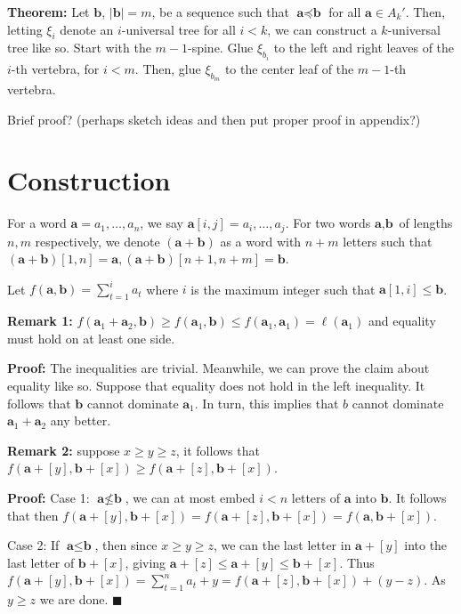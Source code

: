 \documentclass{article}
\begin{document}
\textbf{Theorem:} Let $\textbf{b}$, $|\textbf{b}|=m$, be a sequence such that $\textbf{a}\preceq \textbf{b}$ for all $\textbf{a} \in A_k'$. Then, letting $\xi_i$ denote an $i$-universal tree for all $i<k$, we can construct a $k$-universal tree like so. Start with the $m-1$-spine. Glue $\xi_{b_i}$ to the left and right leaves of the $i$-th vertebra, for $i < m$. Then, glue $\xi_{b_m}$ to the center leaf of the $m-1$-th vertebra.


Brief proof? (perhaps sketch ideas and then put proper proof in appendix?)


\section{Construction}

For a word $\textbf{a} = a_1,\dots ,a_n$, we say $\textbf{a}[i,j] = a_i,\dots, a_j$. For two words $\textbf{a},\textbf{b}$ of lengths $n,m$ respectively, we denote $(\textbf{a}+\textbf{b})$ as a word with $n+m$ letters such that $(\textbf{a}+\textbf{b})[1,n] = \textbf{a}, (\textbf{a}+\textbf{b})[n+1,n+m] = \textbf{b}$.

Let $f(\textbf{a},\textbf{b}) = \sum_{t=1}^i a_t$ where $i$ is the maximum integer such that $\textbf{a}[1,i] \le \textbf{b}$.

\textbf{Remark 1:} $f(\textbf{a}_1+\textbf{a}_2,\textbf{b}) \ge f(\textbf{a}_1,\textbf{b})\le f(\textbf{a}_1,\textbf{a}_1) = \ell(\textbf{a}_1)$ and equality must hold on at least one side.

\textbf{Proof:} The inequalities are trivial. Meanwhile, we can prove the claim about equality like so. Suppose that equality does not hold in the left inequality. It follows that $\textbf{b}$ cannot dominate $\textbf{a}_1$. In turn, this implies that $b$ cannot dominate $\textbf{a}_1 +\textbf{a}_2$ any better. 

\textbf{Remark 2:} suppose $x\ge y\ge z$, it follows that $f(\textbf{a}+[y],\textbf{b}+[x]) \ge f(\textbf{a}+[z],\textbf{b}+[x])$.

\textbf{Proof:} Case 1: $\textbf{a} \not \le \textbf{b}$, we can at most embed $i<n$ letters of $\textbf{a}$ into $\textbf{b}$. It follows that then $f(\textbf{a}+[y],\textbf{b}+[x])  =f(\textbf{a}+[z],\textbf{b}+[x])  = f(\textbf{a},\textbf{b}+[x])$. 

Case 2: If $\textbf{a}\le \textbf{b}$, then since $x \ge y\ge z$, we can the last letter in $\textbf{a}+[y]$ into the last letter of $\textbf{b}+[x]$, giving $\textbf{a}+[z]\le \textbf{a}+[y]\le \textbf{b}+[x]$. Thus $f(\textbf{a}+[y],\textbf{b}+[x]) = \sum_{t=1}^n a_t +y = f(\textbf{a}+[z],\textbf{b}+[x]) +(y-z)$. As $y \ge z$ we are done. $\blacksquare$
\end{document}
